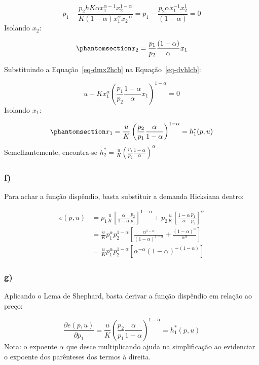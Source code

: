 \documentclass[
  letterpaper,
  DIV=11,
  numbers=noendperiod]{scrartcl}
\begin{document}
\[
p_1 - \frac{p_2hK\alpha x_1^{\alpha-1}x_2^{1-\alpha}}{K(1-\alpha) x_1^{\alpha}x_2^{-\alpha}} =
p_1 - \frac{p_2\alpha x_1^{-1}x_2^1}{(1-\alpha)} = 0
\] Isolando \(x_2\):

\begin{equation}\phantomsection\label{eq-dmx2hcb}{
x_2 = \frac{p_1}{p_2}\frac{(1-\alpha)}{\alpha}x_1
}\end{equation}

Substituindo a Equação~\ref{eq-dmx2hcb} na Equação~\ref{eq-dvhlcb}:

\[
u - Kx_1^\alpha\left(\frac{p_1}{p_2}\frac{1-\alpha}{\alpha}x_1\right)^{1-\alpha} = 0
\] Isolando \(x_1\):

\begin{equation}\phantomsection\label{eq-dhh1cb}{
x_1 = \frac{u}{K}\left(\frac{p_2}{p_1}\frac{\alpha}{1-\alpha}\right)^{1-\alpha} = h_1^*(p,u)
}\end{equation} Semelhantemente, encontra-se
\(h_2^* =  \frac{u}{K}\left(\frac{p_1}{p_2}\frac{1-\alpha}{\alpha}\right)^{\alpha}\)

\subsubsection{f)}\label{f}

Para achar a função dispêndio, basta substituir a demanda Hicksiana
dentro:

\begin{align}
e(p, u) &= p_1 \frac{u}{K} \left[ \frac{\alpha}{1 - \alpha}   \frac{p_2}{p_1} \right]^{1 - \alpha} 
+ p_2   \frac{u}{K} \left[ \frac{1 - \alpha}{\alpha}   \frac{p_1}{p_2} \right]^{\alpha} \\
&= \frac{u}{K} p_1^{\alpha} p_2^{1 - \alpha} 
\left[ \frac{\alpha^{1 - \alpha}}{(1 - \alpha)^{1 - \alpha}} + \frac{(1 - \alpha)^{\alpha}}{\alpha^{\alpha}} \right] \\
&= \frac{u}{K} p_1^{\alpha} p_2^{1 - \alpha} 
\left[ \alpha^{-\alpha} (1 - \alpha)^{-(1 - \alpha)} \right]
\end{align}

\subsubsection{g)}\label{g}

Aplicando o Lema de Shephard, basta derivar a função dispêndio em
relação ao preço:

\[
\frac{\partial e(p,u)}{\partial p_1} = \frac{u}{K}\left(\frac{p_2}{p_1}\frac{\alpha}{1-\alpha}\right)^{1-\alpha} = h_1^*(p,u)
\] Nota: o expoente \(\alpha\) que desce multiplicando ajuda na
simplificação ao evidenciar o expoente dos parênteses dos termos à
direita.
\end{document}
